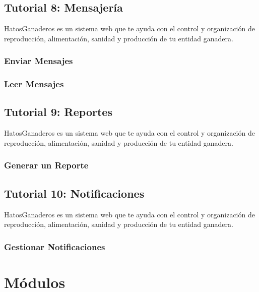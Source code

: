 \documentclass[letterpaper,10pt,english]{sphinxmanual}
\begin{document}
\section{Tutorial 8: Mensajería}
\label{Tutorial 8: Mensajer_xeda::doc}\label{Tutorial 8: Mensajer_xeda:tutorial-8-mensajeria}
HatosGanaderos es un sistema web que te ayuda con el control y organización de reproducción, alimentación, sanidad y producción de tu entidad ganadera.


\subsection{Enviar Mensajes}
\label{Tutorial 8: Mensajer_xeda:enviar-mensajes}

\subsection{Leer Mensajes}
\label{Tutorial 8: Mensajer_xeda:leer-mensajes}

\section{Tutorial 9: Reportes}
\label{Tutorial 9: Reportes:tutorial-9-reportes}\label{Tutorial 9: Reportes::doc}
HatosGanaderos es un sistema web que te ayuda con el control y organización de reproducción, alimentación, sanidad y producción de tu entidad ganadera.


\subsection{Generar un Reporte}
\label{Tutorial 9: Reportes:generar-un-reporte}

\section{Tutorial 10: Notificaciones}
\label{Tutorial 10: Notificaciones::doc}\label{Tutorial 10: Notificaciones:tutorial-10-notificaciones}
HatosGanaderos es un sistema web que te ayuda con el control y organización de reproducción, alimentación, sanidad y producción de tu entidad ganadera.


\subsection{Gestionar Notificaciones}
\label{Tutorial 10: Notificaciones:gestionar-notificaciones}

\chapter{Módulos}
\label{index:modulos}
\end{document}
